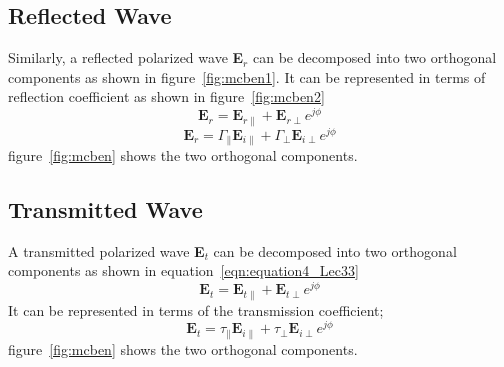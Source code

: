 \subsection{Reflected Wave}
Similarly, a reflected polarized wave \textbf{E$_r$} can be decomposed into two orthogonal components as shown in figure~\ref{fig:mcben1}. It can be represented in terms of reflection coefficient as shown in figure~\ref{fig:mcben2}
\begin{equation}
\textbf{E}_r = \textbf{E}_{r\parallel} + \textbf{E}_{r\perp} e^{j\phi}
\end{equation}	
\begin{equation}
\textbf{E}_r = \Gamma_\parallel \textbf{E}_{i\parallel} + \Gamma_\perp \textbf{E}_{i\perp} e^{j\phi}
\end{equation}	
figure~\ref{fig:mcben} shows the two orthogonal components.

\subsection{Transmitted Wave}
A transmitted polarized wave \textbf{E$_t$} can be decomposed into two orthogonal components as shown in equation~\ref{eqn:equation4_Lec33}
\begin{equation}
\textbf{E}_t = \textbf{E}_{t\parallel} + \textbf{E}_{t\perp} e^{j\phi}
\label{eqn:equation4_Lec33}
\end{equation}
It can be represented in terms of the transmission coefficient;	
\begin{equation}
\textbf{E}_t = \tau_\parallel \textbf{E}_{i\parallel} + \tau_\perp\textbf{E}_{i\perp} e^{j\phi}
\end{equation}	
figure~\ref{fig:mcben} shows the two orthogonal components.	

